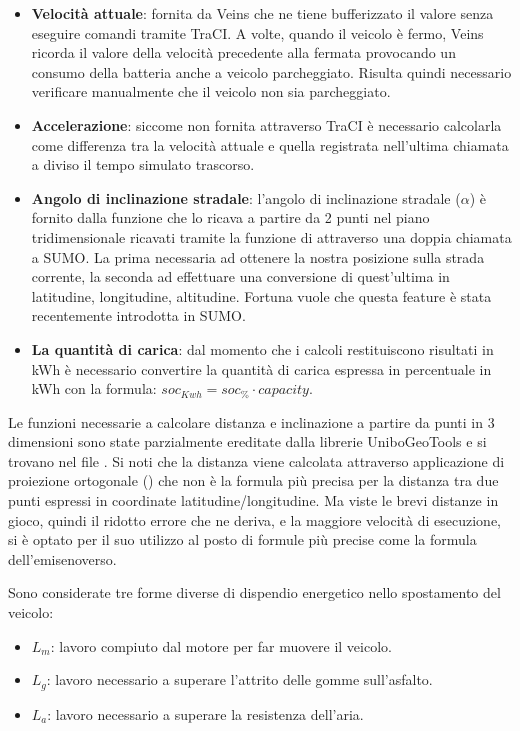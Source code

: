 \begin{itemize}
	\item \textbf{Velocità attuale}: fornita da Veins che ne tiene bufferizzato il valore senza eseguire comandi tramite TraCI. A volte, quando il veicolo è fermo, Veins ricorda il valore della velocità precedente alla fermata provocando un consumo della batteria anche a veicolo parcheggiato. Risulta quindi necessario verificare manualmente che il veicolo non sia parcheggiato.
	\item \textbf{Accelerazione}: siccome non fornita attraverso TraCI è necessario calcolarla come differenza tra la velocità attuale e quella registrata nell'ultima chiamata a  diviso il tempo simulato trascorso.
	\item \textbf{Angolo di inclinazione stradale}: l'angolo di inclinazione stradale ($\alpha$) è fornito dalla funzione  che lo ricava a partire da 2 punti nel piano tridimensionale ricavati tramite la funzione  di  attraverso una doppia chiamata a SUMO. La prima necessaria ad ottenere la nostra posizione sulla strada corrente, la seconda ad effettuare una conversione di quest'ultima in latitudine, longitudine, altitudine. Fortuna vuole che questa feature è stata recentemente introdotta in SUMO.
	\item \textbf{La quantità di carica}: dal momento che i calcoli restituiscono risultati in kWh è necessario convertire la quantità di carica espressa in percentuale in kWh con la formula: $soc_{Kwh} = soc_{\%} \cdot capacity$.
\end{itemize}

Le funzioni necessarie a calcolare distanza e inclinazione a partire da punti in 3 dimensioni sono state parzialmente ereditate dalla librerie UniboGeoTools e si trovano nel file . Si noti che la distanza viene calcolata attraverso applicazione di proiezione ortogonale () che non è la formula più precisa per la distanza tra due punti espressi in coordinate latitudine/longitudine. Ma viste le brevi distanze in gioco, quindi il ridotto errore che ne deriva, e la maggiore velocità di esecuzione, si è optato per il suo utilizzo al posto di formule più precise come la formula dell'emisenoverso.

Sono considerate tre forme diverse di dispendio energetico nello spostamento del veicolo:

\begin{itemize}
	\item \textbf{$L_m$}: lavoro compiuto dal motore per far muovere il veicolo.
	\item \textbf{$L_g$}: lavoro necessario a superare l'attrito delle gomme sull'asfalto.
	\item \textbf{$L_a$}: lavoro necessario a superare la resistenza dell'aria.
\end{itemize}

